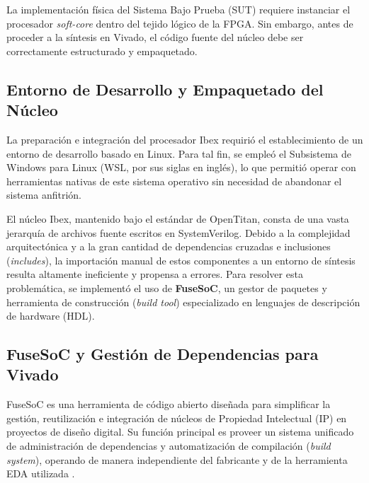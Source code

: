 La implementación física del Sistema Bajo Prueba (SUT) requiere instanciar el procesador \textit{soft-core} dentro del tejido lógico de la FPGA. Sin embargo, antes de proceder a la síntesis en Vivado, el código fuente del núcleo debe ser correctamente estructurado y empaquetado. 

\subsection{Entorno de Desarrollo y Empaquetado del Núcleo}

La preparación e integración del procesador Ibex requirió el establecimiento de un entorno de desarrollo basado en Linux. Para tal fin, se empleó el Subsistema de Windows para Linux (WSL, por sus siglas en inglés), lo que permitió operar con herramientas nativas de este sistema operativo sin necesidad de abandonar el sistema anfitrión.

El núcleo Ibex, mantenido bajo el estándar de OpenTitan, consta de una vasta jerarquía de archivos fuente escritos en SystemVerilog. Debido a la complejidad arquitectónica y a la gran cantidad de dependencias cruzadas e inclusiones (\textit{includes}), la importación manual de estos componentes a un entorno de síntesis resulta altamente ineficiente y propensa a errores. Para resolver esta problemática, se implementó el uso de \textbf{FuseSoC}, un gestor de paquetes y herramienta de construcción (\textit{build tool}) especializado en lenguajes de descripción de hardware (HDL).


\subsection{FuseSoC y Gestión de Dependencias para Vivado}
\label{ssec:fuse}
FuseSoC es una herramienta de código abierto diseñada para simplificar la gestión, reutilización e integración de núcleos de Propiedad Intelectual (IP) en proyectos de diseño digital. Su función principal es proveer un sistema unificado de administración de dependencias y automatización de compilación (\textit{build system}), operando de manera independiente del fabricante y de la herramienta EDA utilizada \cite{kindgren2019scalable}.

